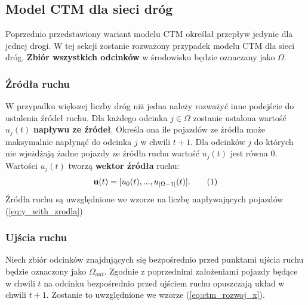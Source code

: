 \documentclass[12pt]{book}
\theoremstyle{plain}
\newcommand\addtag{\refstepcounter{equation}
\renewcommand{\labelenumii}{\theenumii}
\renewcommand{\theenumii}{\theenumi.\arabic{enumii}.}
\tag{\theequation}}
\newcommand{\myref}[1]{(\ref{#1})}
\begin{document}
\subsection{Model CTM dla sieci dróg}
Poprzednio przedstawiony wariant modelu CTM określał przepływ jedynie dla jednej drogi. W tej sekcji zostanie rozważony przypadek modelu CTM dla sieci dróg. \textbf{Zbiór wszystkich odcinków} w środowisku będzie oznaczany jako $\Omega$. 
\subsubsection{Źródła ruchu}
W przypadku większej liczby dróg niż jedna należy rozważyć inne podejście do ustalenia źródeł ruchu. 
Dla każdego odcinka $j \in \Omega$ zostanie ustalona wartość $u_j(t)$ \textbf{napływu ze źródeł}. Określa ona ile pojazdów ze źródła może maksymalnie napłynąć do odcinka $j$ w chwili $t+1$. Dla odcinków $j$ do których nie wjeżdżają żadne pojazdy ze źródła ruchu wartość $u_j(t)$ jest równa 0. Wartości $u_j(t)$ tworzą \textbf{wektor źródła} ruchu:
\[\textbf{u}(t)=[u_0(t),...,u_{|\Omega-1|}(t)]. \addtag \]
Źródła ruchu są uwzględnione we wzorze na liczbę napływających pojazdów \myref{eq:y_with_zrodla}
\subsubsection{Ujścia ruchu}
Niech zbiór odcinków znajdujących się bezpośrednio przed punktami ujścia ruchu będzie oznaczony jako $\Omega_{out}$.
Zgodnie z poprzednimi założeniami pojazdy będące w chwili $t$ na odcinku bezpośrednio przed ujściem ruchu opuszczają układ w chwili $t+1$. Zostanie to uwzględnione we wzorze \myref{eq:ctm_rozwoj_x}.
\end{document}
